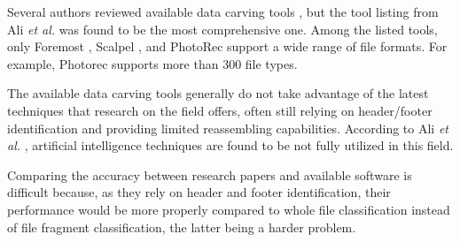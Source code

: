 Several authors reviewed  available data carving tools
\cite{ali_review_2018}
\cite{qiu_new_2014}
\cite{nadeem_ashraf_forensic_2013}
\cite{roux_reconstructing_2008}, 
but the tool listing from Ali \textit{et al.} \cite{ali_review_2018} was found to be the most comprehensive one. Among the listed tools, only Foremost \cite{kendall_foremost_2019}, Scalpel \cite{richard_iii_scalpel:_2005}, and PhotoRec \cite{grenier_photorec_2019} support a wide range of file formats. For example, Photorec supports more than 300 file types.

The available data carving tools generally do not take advantage of the latest techniques that research on the field offers, often still relying on header/footer identification and providing limited reassembling capabilities.
According to Ali \textit{et al.} \cite{ali_review_2018}, artificial intelligence techniques are found to be not fully utilized in this field.

Comparing the accuracy between research papers and available software is difficult because, as they rely on header and footer identification, their performance would be more properly compared to whole file classification instead of file fragment classification, the latter being a harder problem.
